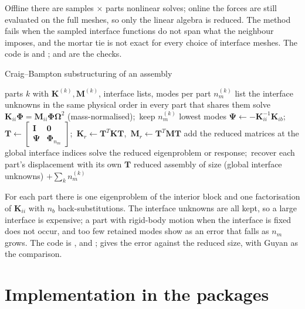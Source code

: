 Offline there are samples $\times$ parts nonlinear solves; online the forces are still evaluated on the full meshes, so only the linear algebra is reduced. The method fails when the sampled interface functions do not span what the neighbour imposes, and the mortar tie is not exact for every choice of interface meshes. The code is  and ;  and  are the checks.


\begin{algbox}{Craig--Bampton substructuring of an assembly}
\begin{pseudo}
\Require parts $k$ with $\bm K^{(k)},\bm M^{(k)}$, interface lists, modes per part $n_m^{(k)}$
\State list the interface unknowns in the same physical order in every part that shares them
  \State solve $\bm K_{ii}\bm\Phi=\bm M_{ii}\bm\Phi\bm\Omega^2$ (mass-normalised);\ keep $n_m^{(k)}$ lowest modes
  \State $\bm\Psi\gets-\bm K_{ii}^{-1}\bm K_{ib}$;\ $\bm T\gets\begin{bmatrix}\bm I&\bm0\\\bm\Psi&\bm\Phi_{n_m}\end{bmatrix}$;\ $\bm K_r\gets\bm T^T\bm K\bm T$,\ $\bm M_r\gets\bm T^T\bm M\bm T$
\EndFor
\State add the reduced matrices at the global interface indices 
\State solve the reduced eigenproblem or response;\ recover each part's displacement with its own $\bm T$
\Ensure reduced assembly of size (global interface unknowns) $+\sum_kn_m^{(k)}$
\end{pseudo}
\end{algbox}

For each part there is one eigenproblem of the interior block and one factorisation of $\bm K_{ii}$ with $n_b$ back-substitutions. The interface unknowns are all kept, so a large interface is expensive; a part with rigid-body motion when the interface is fixed does not occur, and too few retained modes show as an error that falls as $n_m$ grows. The code is ,  and ;  gives the error against the reduced size, with Guyan as the comparison.

\section{Implementation in the packages}\label{sec:cm-impl}

